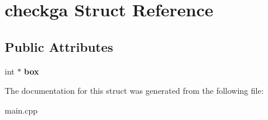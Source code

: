 \hypertarget{structcheckga}{\section{checkga Struct Reference}
\label{structcheckga}
}
\subsection*{Public Attributes}
\begin{DoxyCompactItemize}
\item 
\hypertarget{structcheckga_afa9cda6cb0f473e12d2529b4f171b25f}{int $\ast$ {\bfseries box}}\label{structcheckga_afa9cda6cb0f473e12d2529b4f171b25f}

\end{DoxyCompactItemize}


The documentation for this struct was generated from the following file\-:\begin{DoxyCompactItemize}
\item 
main.\-cpp\end{DoxyCompactItemize}
